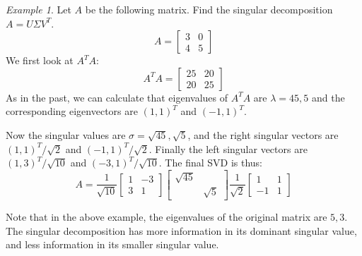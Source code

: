 \documentclass[11pt,oneside]{amsbook}
\theoremstyle{definition}
\theoremstyle{plain}
\theoremstyle{definition}
\theoremstyle{remark}
\newtheorem{example}[theorem]{Example}
\numberwithin{equation}{section}
\numberwithin{figure}{section}
\begin{document}
\begin{example}
  Let $A$ be the following matrix. Find the singular decomposition $A=U\Sigma V^T$.
  \[A=\begin{bmatrix}3&0\\4&5\end{bmatrix}
  \]
  We first look at $A^TA$:
  \[A^TA=\begin{bmatrix}25&20\\20&25\end{bmatrix}
  \]
  As in the past, we can calculate that eigenvalues of $A^TA$ are $\lambda=45,5$ and the corresponding eigenvectors are $(1,1)^T$ and $(-1,1)^T$.
  
  Now the singular values are $\sigma=\sqrt{45},\sqrt{5}$, and the right singular vectors are $(1,1)^T/\sqrt{2}$ and $(-1,1)^T/\sqrt{2}$. Finally the left singular vectors are $(1,3)^T/\sqrt{10}$ and $(-3,1)^T/\sqrt{10}$. The final SVD is thus:
  \[A=\frac{1}{\sqrt{10}}\begin{bmatrix}1&-3\\3&1\end{bmatrix}
  \begin{bmatrix}\sqrt{45}\\&\sqrt{5}\end{bmatrix}
  \frac{1}{\sqrt{2}}\begin{bmatrix}1&1\\-1&1\end{bmatrix}
  \]
\end{example}

Note that in the above example, the eigenvalues of the original matrix are $5,3$. The singular decomposition has more information in its dominant singular value, and less information in its smaller singular value.
\end{document}
